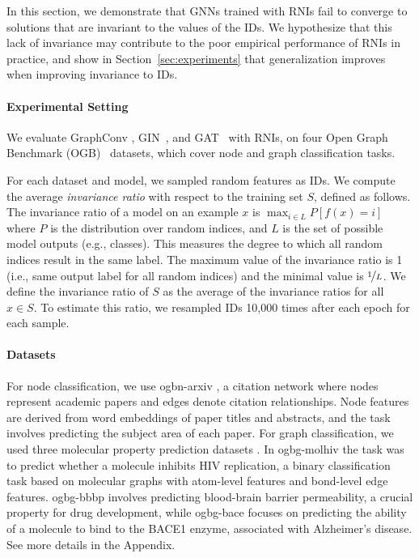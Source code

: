 In this section, we demonstrate that GNNs trained with RNIs fail to converge to solutions that are invariant to the values of the IDs. 
We hypothesize that this lack of invariance may contribute to the poor empirical performance of RNIs in practice, and show in Section~\ref{sec:experiments} that generalization improves when improving invariance to IDs.

\paragraph{Experimental Setting}
We evaluate GraphConv \cite{morris2021weisfeiler}, GIN~\cite{gin}, and GAT~\cite{gat} with RNIs, on
four Open Graph Benchmark (OGB)~\cite{ogb} datasets, which cover node and graph classification tasks. 


For each dataset and model, we sampled random features as IDs. We compute the average \textit{invariance ratio} with respect to the training set $S$, defined as follows. 
 The invariance ratio of a model on an example $x$ is $\max_{i\in L} P[f(x)=i]$ where $P$ is the distribution over random indices, and $L$ is the set of possible model outputs (e.g., classes). This measures the degree to which all random indices result in the same label.
The maximum value of the invariance ratio is 1 (i.e., same output label for all random indices) and the minimal value is $\nicefrac{1}{L}$.
 We define the invariance ratio of $S$ as the average of the invariance ratios for all $x\in S$.
To estimate this ratio, we resampled IDs 10,000 times after each epoch for each sample.

\paragraph{Datasets}
For node classification, we use ogbn-arxiv \cite{ogb}, a citation network where nodes represent academic papers and edges denote citation relationships. Node features are derived from word embeddings of paper titles and abstracts, and the task involves predicting the subject area of each paper. For graph classification, we used three molecular property prediction datasets \cite{ogb}. In ogbg-molhiv the task was to predict whether a molecule inhibits HIV replication, a binary classification task based on molecular graphs with atom-level features and bond-level edge features. ogbg-bbbp involves predicting blood-brain barrier permeability, a crucial property for drug development, while ogbg-bace focuses on predicting the ability of a molecule to bind to the BACE1 enzyme, associated with Alzheimer’s disease. See more details in the Appendix.





